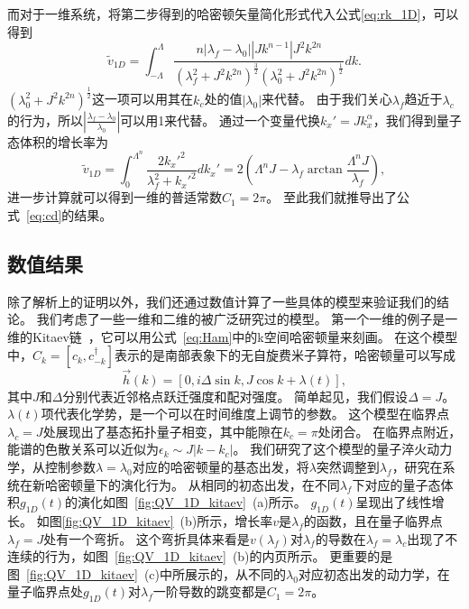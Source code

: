 			而对于一维系统，将第二步得到的哈密顿矢量简化形式代入公式\eqref{eq:rk_1D}，可以得到
			\begin{equation}
				\tilde{v}_{1D} = \int_{-\Lambda}^{\Lambda}{\frac{n |\lambda_f-\lambda_0||J k^{n-1}|J^2 k^{2n}}{(\lambda_f^2+J^2 k^{2n})^{\frac32}(\lambda_0^2+J^2 k^{2n})^{\frac12}} dk}.
			\end{equation}
			$(\lambda_0^2+J^2 k^{2n})^{\frac12}$这一项可以用其在$k_c$处的值$|\lambda_0|$来代替。
			由于我们关心$\lambda_f$趋近于$\lambda_c$的行为，所以$|\frac{\lambda_f-\lambda_0}{\lambda_0}|$可以用1来代替。
			通过一个变量代换$k_x'=J k_x^\alpha$，我们得到量子态体积的增长率为
			\begin{equation}
				\tilde{v}_{1D} = \int_{0}^{\Lambda^n}{\frac{2k_x'^2}{\lambda_f^2+k_x'^2}}dk_x'
				= 2\left(\Lambda^nJ-\lambda_f\arctan{\frac{\Lambda^nJ}{\lambda_f}}\right),
			\end{equation}
			进一步计算就可以得到一维的普适常数$C_1=2\pi$。
			至此我们就推导出了公式~\eqref{eq:cd}的结果。
			
		\subsection{数值结果}
			除了解析上的证明以外，我们还通过数值计算了一些具体的模型来验证我们的结论。
			我们考虑了一些一维和二维的被广泛研究过的模型。
			第一个一维的例子是一维的Kitaev链~\cite{Kitaev2001}，它可以用公式~\eqref{eq:Ham}中的k空间哈密顿量来刻画。
			在这个模型中，$C_k = [c_k, c_{-k}^\dag]$表示的是南部表象下的无自旋费米子算符，哈密顿量可以写成~\cite{Kitaev2001}
			\begin{equation}
				\vec{h}(k) = [0, i\Delta\sin k, J\cos k + \lambda(t)],
			\end{equation}
			其中$J$和$\Delta$分别代表近邻格点跃迁强度和配对强度。
			简单起见，我们假设$\Delta = J$。
			$\lambda(t)$项代表化学势，是一个可以在时间维度上调节的参数。
			这个模型在临界点$\lambda_c = J$处展现出了基态拓扑量子相变，其中能隙在$k_c = \pi$处闭合。
			在临界点附近，能谱的色散关系可以近似为$\epsilon_k \sim J|k - k_c|$。
			我们研究了这个模型的量子淬火动力学，从控制参数$\lambda=\lambda_0$对应的哈密顿量的基态出发，将$\lambda$突然调整到$\lambda_f$，研究在系统在新哈密顿量下的演化行为。
			从相同的初态出发，在不同$\lambda_f$下对应的量子态体积$g_{1D}(t)$的演化如图~\ref{fig:QV_1D_kitaev}~(a)所示。
			$g_{1D}(t)$呈现出了线性增长。
			如图\ref{fig:QV_1D_kitaev}~(b)所示，增长率$v$是$\lambda_f$的函数，且在量子临界点$\lambda_f=J$处有一个弯折。
			这个弯折具体来看是$v(\lambda_f)$对$\lambda_f$的导数在$\lambda_f=\lambda_c$出现了不连续的行为，如图~\ref{fig:QV_1D_kitaev}~(b)的内页所示。
			更重要的是图~\ref{fig:QV_1D_kitaev}~(c)中所展示的，从不同的$\lambda_0$对应初态出发的动力学，在量子临界点处$g_{1D}(t)$对$\lambda_f$一阶导数的跳变都是$C_1=2\pi$。
			
